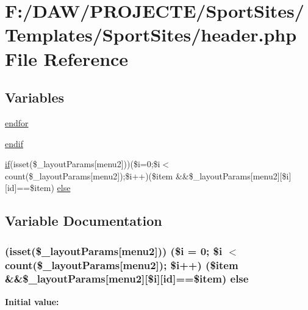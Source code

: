 \hypertarget{header_8php}{}\section{F\+:/\+D\+A\+W/\+P\+R\+O\+J\+E\+C\+T\+E/\+Sport\+Sites/\+Templates/\+Sport\+Sites/header.php File Reference}
\label{header_8php}
\subsection*{Variables}
\begin{DoxyCompactItemize}
\item 
\hyperlink{header_8php_ae8fdc27183f296411bac00ed522ee1ac}{endfor}
\item 
\hyperlink{header_8php_a2f576def868d9b1e442c2042a246de2a}{endif}
\item 
\hyperlink{app_2views_2index_2index_8php_af71ebd4d252438a1590e85e150ce8954}{if}(isset(\$\+\_\+layout\+Params\mbox{[}\textquotesingle{}menu2\textquotesingle{}\mbox{]}))(\$i=0;\$i$<$ count(\$\+\_\+layout\+Params\mbox{[}\textquotesingle{}menu2\textquotesingle{}\mbox{]});\$i++)(\$item \&\&\$\+\_\+layout\+Params\mbox{[}\textquotesingle{}menu2\textquotesingle{}\mbox{]}\mbox{[}\$i\mbox{]}\mbox{[}\textquotesingle{}id\textquotesingle{}\mbox{]}==\$item) \hyperlink{header_8php_ae69d798cba64778886b1a564b11f2793}{else}
\end{DoxyCompactItemize}


\subsection{Variable Documentation}
\hypertarget{header_8php_ae69d798cba64778886b1a564b11f2793}{}
\subsubsection[{else}]{(isset(\$\+\_\+layout\+Params\mbox{[}\textquotesingle{}menu2\textquotesingle{}\mbox{]})) (\$i = 0; \$i $<$ count(\$\+\_\+layout\+Params\mbox{[}\textquotesingle{}menu2\textquotesingle{}\mbox{]}); \$i++) (\$item \&\&\$\+\_\+layout\+Params\mbox{[}\textquotesingle{}menu2\textquotesingle{}\mbox{]}\mbox{[}\$i\mbox{]}\mbox{[}\textquotesingle{}id\textquotesingle{}\mbox{]}==\$item) else}\label{header_8php_ae69d798cba64778886b1a564b11f2793}
{\bfseries Initial value\+:}
\hypertarget{header_8php_ae8fdc27183f296411bac00ed522ee1ac}{}
